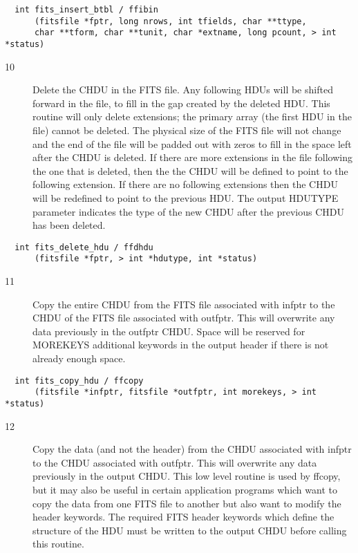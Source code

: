 \begin{verbatim}
  int fits_insert_btbl / ffibin
      (fitsfile *fptr, long nrows, int tfields, char **ttype,
      char **tform, char **tunit, char *extname, long pcount, > int *status)
\end{verbatim}

\begin{description}
\item[10] Delete the CHDU in the FITS file.  Any following HDUs will be shifted
    forward in the file, to fill in the gap created by the deleted HDU.
    This routine will only delete extensions; the primary array (the first
    HDU in the file) cannot be deleted.  The physical size of the FITS file
    will not change and the end of the file will be padded out with
    zeros to fill in the space left after the CHDU is deleted. If
    there are more extensions in the file following the one that is deleted,
    then the the CHDU will be defined to point to the following extension.
    If there are no following extensions then the CHDU will be redefined
    to point to the previous HDU.  The output HDUTYPE parameter
    indicates the type of the new CHDU after the previous CHDU has been
   deleted.
\end{description}

\begin{verbatim}
  int fits_delete_hdu / ffdhdu
      (fitsfile *fptr, > int *hdutype, int *status)
\end{verbatim}

\begin{description}
\item[11] Copy the entire CHDU from the FITS file associated with infptr to the CHDU
    of the FITS file associated with outfptr. This will overwrite any data
    previously in the outfptr CHDU.  Space will be reserved for MOREKEYS
    additional  keywords in the output header if there is not already enough
   space.
\end{description}

\begin{verbatim}
  int fits_copy_hdu / ffcopy
      (fitsfile *infptr, fitsfile *outfptr, int morekeys, > int *status)
\end{verbatim}

\begin{description}
\item[12] Copy the data (and not the header) from the CHDU associated with infptr
    to the CHDU associated with outfptr. This will overwrite
    any data previously in the output CHDU.  This low level routine is used
    by ffcopy, but it may also be useful in certain application programs
    which want to copy the data from one FITS file to another but also
    want to modify the header keywords. The required FITS header keywords
    which define the structure of the HDU must be written to the
   output CHDU before calling this routine.
\end{description}

